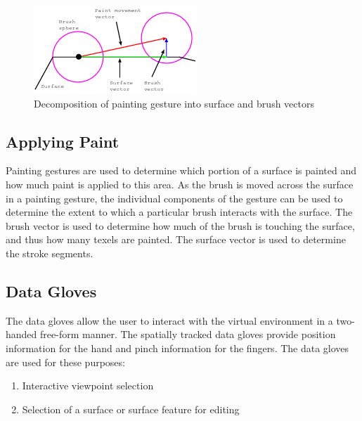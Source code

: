 \documentclass[10pt,twocolumn]{article}
\begin{document}
\begin{figure}
\includegraphics{SurfaceBrushDecomposition.png}
\caption{Decomposition of painting gesture into surface and brush vectors}
\label{SurfaceBrushDecomposition}
\end{figure}

\subsection{Applying Paint}
\indent Painting gestures are used to determine which portion of a surface is painted
and how much paint is applied to this area. As the brush is moved across the surface
in a painting gesture, the individual components of the gesture can be used to 
determine the extent to which a particular brush interacts with the surface. 
The brush vector is used to determine how much of the brush
is touching the surface, and thus how many texels are painted.
The surface vector is used to determine the stroke segments. 


\subsection{Data Gloves}
\indent The data gloves allow the user to interact with 
the virtual environment in a two-handed free-form manner.
The spatially tracked data gloves provide 
position information for the hand and pinch information for the fingers.
The data gloves are used for these purposes:

\begin{enumerate}

\item Interactive viewpoint selection 
\item Selection of a surface or surface feature for editing 

\end{enumerate}
\end{document}
